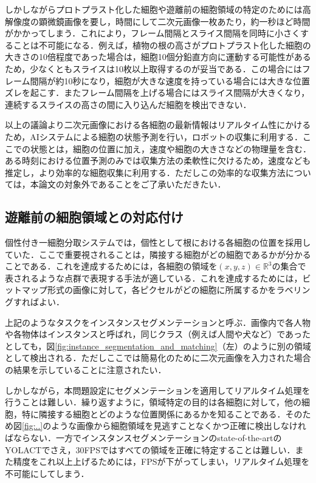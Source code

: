     しかしながらプロトプラスト化した細胞や遊離前の細胞領域の特定のためには高解像度の顕微鏡画像を要し，時間にして二次元画像一枚あたり，約一秒ほど時間がかかってしまう．これにより，フレーム間隔とスライス間隔を同時に小さくすることは不可能になる．例えば，植物の根の高さがプロトプラスト化した細胞の大きさの10倍程度であった場合は，細胞10個分鉛直方向に運動する可能性があるため，少なくともスライスは10枚以上取得するのが妥当である．この場合にはフレーム間隔が約10秒になり，細胞が大きな速度を持っている場合には大きな位置ズレを起こす．またフレーム間隔を上げる場合にはスライス間隔が大きくなり，連続するスライスの高さの間に入り込んだ細胞を検出できない．

    以上の議論より二次元画像における各細胞の最新情報はリアルタイム性にかけるため，AIシステムによる細胞の状態予測を行い，ロボットの収集に利用する．ここでの状態とは，細胞の位置に加え，速度や細胞の大きさなどの物理量を含む．ある時刻における位置予測のみでは収集方法の柔軟性に欠けるため，速度なども推定し，より効率的な細胞収集に利用する．ただしこの効率的な収集方法については，本論文の対象外であることをご了承いただきたい．

    \subsection{遊離前の細胞領域との対応付け}

    個性付き一細胞分取システムでは，個性として根における各細胞の位置を採用していた．ここで重要視されることは，隣接する細胞がどの細胞であるかが分かることである．これを達成するためには，各細胞の領域を${(x, y, z)} \in \mathbb{R}^3$の集合で表されるような点群で表現する手法が適している．これを達成するためには，ビットマップ形式の画像に対して，各ピクセルがどの細胞に所属するかをラベリングすればよい．

    上記のようなタスクをインスタンスセグメンテーション\cite{hafiz2020survey}と呼ぶ．画像内で各人物や各物体はインスタンスと呼ばれ，同じクラス（例えば人間や犬など）であったとしても，図\ref{fig:instance_segmentation_and_matching}（左）のように別の領域として検出される．ただしここでは簡易化のために二次元画像を入力された場合の結果を示していることに注意されたい．

    しかしながら，本問題設定にセグメンテーションを適用してリアルタイム処理を行うことは難しい．繰り返すように，領域特定の目的は各細胞に対して，他の細胞，特に隣接する細胞とどのような位置関係にあるかを知ることである．そのため図\ref{fig:..}のような画像から細胞領域を見逃すことなくかつ正確に検出しなければならない．一方でインスタンスセグメンテーションのstate-of-the-artのYOLACT\cite{Bolya_2019_ICCV}でさえ，30FPSではすべての領域を正確に特定することは難しい．また精度をこれ以上上げるためには，FPSが下がってしまい，リアルタイム処理を不可能にしてしまう．

